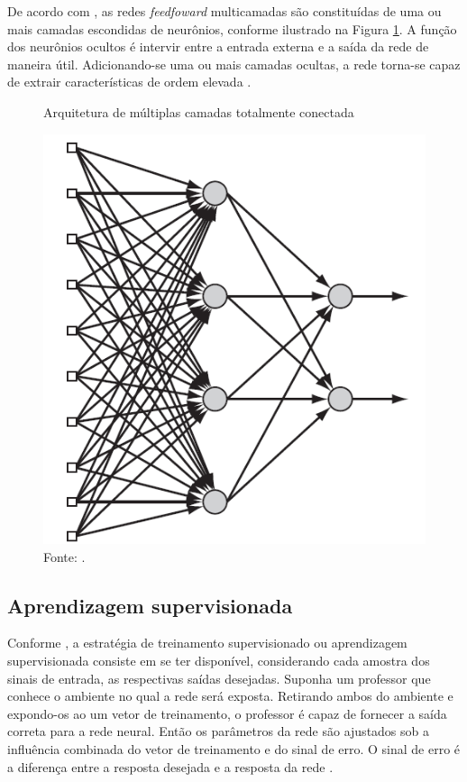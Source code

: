 De acordo com , as redes \textit{feedfoward} multicamadas são constituídas de uma ou mais camadas escondidas de neurônios, conforme ilustrado na Figura \ref{fig:camadamultipla}. A função dos neurônios ocultos é intervir entre a entrada externa e a saída da rede de maneira útil. Adicionando-se uma ou mais camadas ocultas, a rede torna-se capaz de extrair características de ordem elevada \cite{haykin}.
\begin{figure}[H]
	\vspace{4mm}
	\centering
	\caption{Arquitetura de múltiplas camadas totalmente conectada}
	\label{fig:camadamultipla}
	\includegraphics[scale=0.5]{imagens/rede_fully}
	\caption*{Fonte: .}
\end{figure}

\subsection{Aprendizagem supervisionada}
Conforme , a estratégia de treinamento supervisionado ou aprendizagem supervisionada consiste em se ter disponível, considerando cada amostra dos sinais de entrada, as respectivas saídas desejadas. Suponha um professor que conhece o ambiente no qual a rede será exposta. Retirando ambos do ambiente e expondo-os ao um vetor de treinamento, o professor é capaz de fornecer a saída correta para a rede neural. Então os parâmetros da rede são ajustados sob a influência combinada do vetor de treinamento e do sinal de erro. O sinal de erro é a diferença entre a resposta desejada e a resposta da rede \cite{haykin}.

